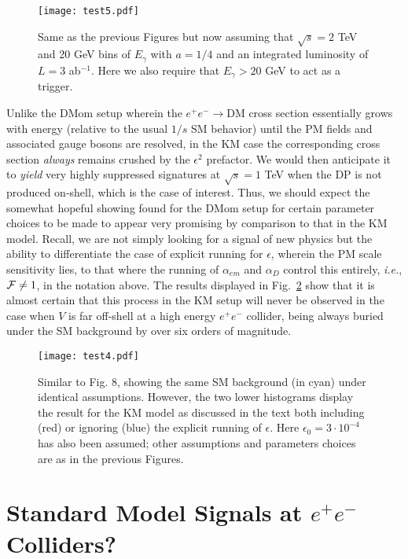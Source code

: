 \documentclass[14pt]{article}
\def\ie{{\it i.e.}}
\def\to{\rightarrow}
\begin{document}
{%
\begin{figure}[htbp]
\centerline{\texttt{[image: test5.pdf]}}
\vspace*{-1.3cm}
\caption{Same as the previous Figures but now assuming that $\sqrt s=2$ TeV and 20 GeV bins of $E_\gamma$ with $a=1/4$ and an integrated luminosity of $L=3$ ab$^{-1}$. Here we also require 
that $E_\gamma >20$ GeV to act as a trigger.}
\label{fig7p}
\end{figure}
%

Unlike the DMom setup wherein the $e^+e^-\to $DM cross section essentially grows with energy (relative to the usual $1/s$ SM behavior) until the PM fields and associated gauge 
bosons are resolved, in the KM case the corresponding cross section {\it always} remains crushed by the $\epsilon^2$ prefactor. We would then anticipate it to {\it yield} very highly suppressed 
signatures at $\sqrt s=1$ TeV when the DP is not produced on-shell, which is the case of interest. Thus, we should expect the somewhat hopeful showing found for the DMom setup for certain parameter 
choices to be made to appear very promising by comparison to that in the KM model. Recall, we are not simply looking for a signal of new physics but the ability to differentiate the case of explicit running 
for $\epsilon$, wherein the PM scale sensitivity lies, to that where the running of $\alpha_{em}$ and $\alpha_D$ control this entirely, \ie, ${\cal {F}}\neq 1$, in the notation above. The results displayed 
in Fig.~\ref{fig8} show that it is almost certain that this process in the KM setup will never be observed in the case when $V$ is far off-shell at a high energy $e^+e^-$ collider, being always 
buried under the SM background by over six orders of magnitude.

%
\begin{figure}[htbp]
\centerline{\texttt{[image: test4.pdf]}}
\vspace*{-1.3cm}
\caption{Similar to Fig. 8, showing the same SM background (in cyan) under identical assumptions. However, the two lower histograms display the result for the KM model as 
discussed in the text both including (red) or ignoring (blue) the explicit running of $\epsilon$. Here $\epsilon_0=3\cdot 10^{-4}$ has also been assumed; other assumptions and parameters 
choices are as in the previous Figures.}
\label{fig8}
\end{figure}
%


\section{Standard Model Signals at $e^+e^-$ Colliders?}

}
\end{document}
